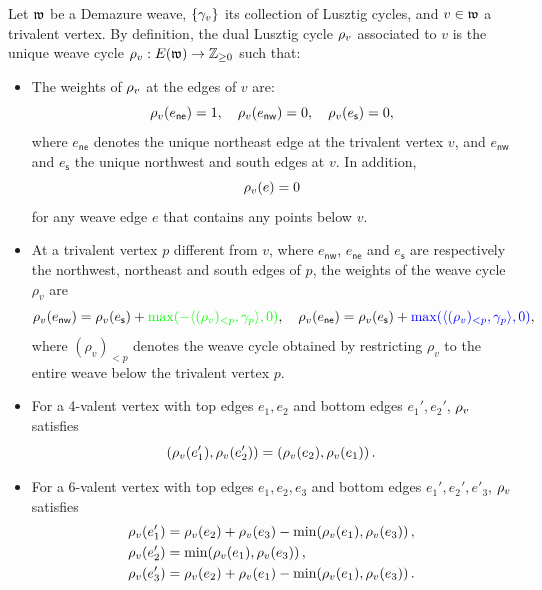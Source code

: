 \begin{definition}\label{def:dual_Lusztig_cycles}
Let $\mathfrak{w}$ be a Demazure weave, $\{\gamma_v\}$ its collection of Lusztig cycles, and $v\in\mathfrak{w}$ a trivalent vertex. By definition, the dual Lusztig cycle $\rho_v$ associated to $v$ is the unique weave cycle $\rho_v: E(\mathfrak{w}) \to \mathbb{Z}_{\ge 0}$ such that:\\
\begin{itemize}
    \item[$(i)$] The weights of $\rho_v$ at the edges of $v$ are:
    $$\rho_v(e_\mathsf{ne})=1,\quad \rho_v(e_\mathsf{nw})=0,\quad \rho_v(e_\mathsf{s})=0,$$
    where $e_\mathsf{ne}$ denotes the unique northeast edge at the trivalent vertex $v$, and $e_\mathsf{nw}$ and $e_\mathsf{s}$ the unique northwest and south edges at $v$. In addition,
    $$\rho_v(e)=0$$
    for any weave edge $e$ that contains any points below $v$.\\
    
    \item[$(ii)$] At a trivalent vertex $p$ different from $v$, where $e_\mathsf{nw}$, $e_\mathsf{ne}$ and $e_\mathsf{s}$ are respectively the northwest, northeast and south edges of $p$, the weights of the weave cycle $
    \rho_v$ are
    \begin{equation}\label{eq:dualLusztigcycle_trivalentrule_left}
    \rho_v(e_\mathsf{nw})=\rho_v(e_\mathsf{s})+\textcolor{green}{\max(-\langle (\rho_v)_{<p},\gamma_p\rangle,0)},\quad \rho_v(e_\mathsf{ne})=\rho_v(e_\mathsf{s})+\textcolor{blue}{\max(\langle (\rho_v)_{<p},\gamma_p\rangle,0)},
    \end{equation}
    where $(\rho_v)_{<p}$ denotes the weave cycle obtained by restricting $\rho_v$ to the entire weave below the trivalent vertex $p$.\\
    
    \item[$(iii)$] For a 4-valent vertex  with top edges $e_1,e_2$ and  bottom edges $e_1',e_2'$, $\rho_v$ satisfies
    \[(\rho_v(e'_1),\rho_v(e'_2))=(\rho_v(e_2),\rho_v(e_1))\,.\]
    
    \item[$(iv)$] For a 6-valent vertex  with top edges $e_1,e_2,e_3$ and bottom edges $e_1',e_2',e'_3$, $\rho_v$ satisfies
    \begin{align*}
        \rho_v(e'_1) & = \rho_v(e_2)+\rho_v(e_3)-\min(\rho_v(e_1),\rho_v(e_3))\,,\\
        \rho_v(e'_2) & = \min(\rho_v(e_1),\rho_v(e_3))\,,\\
        \rho_v(e'_3) & = \rho_v(e_2)+\rho_v(e_1)-\min(\rho_v(e_1),\rho_v(e_3))\,.
    \end{align*}
\end{itemize}
\sbs
\end{definition}


